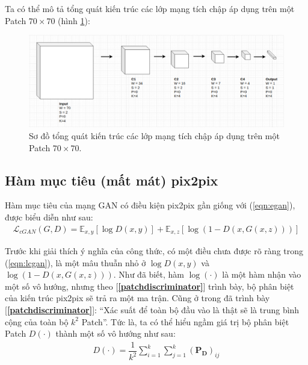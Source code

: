 \documentclass[a4paper, 12pt]{report}
\begin{document}
Ta có thể mô tả tổng quát kiến trúc các lớp mạng tích chập áp dụng trên một Patch $70 \times 70$ (hình \ref{fig:dis70pix2pix}):

\begin{figure}[!h]
\captionsetup{width=0.8\textwidth}
\centering
\includegraphics[width=16cm]{images/dis70pix2pix.png}
\caption{Sơ đồ tổng quát kiến trúc các lớp mạng tích chập áp dụng trên một Patch $70 \times 70$.}
\label{fig:dis70pix2pix}
\end{figure}

\subsection{Hàm mục tiêu (mất mát) pix2pix}\label{objofpix2pix}

Hàm mục tiêu của mạng GAN có điều kiện pix2pix gần giống với (\ref{eqn:egan}), được biểu diễn như sau:
\begin{align}
    \mathcal{L}_{cGAN}\left(G, D\right) = \mathbb{E}_{x, y}\left[\log D\left(x, y\right)\right] + \mathbb{E}_{x, z}\left[\log\left(1-D\left(x, G\left(x, z\right)\right)\right)\right]\label{eqn:lcgan}
\end{align}

Trước khi giải thích ý nghĩa của công thức, có một điều chưa được rõ ràng trong (\ref{eqn:lcgan}), là một mâu thuẫn nhỏ ở $\log D\left(x, y\right)$ và $\log\left(1-D\left(x, G\left(x, z\right)\right)\right)$.
Như đã biết, hàm $\log\left(\cdot\right)$ là một hàm nhận vào một số vô hướng, nhưng theo [\textbf{\ref{patchdiscriminator}}] trình bày, bộ phân biệt của kiến trúc pix2pix sẽ trả ra một ma trận.
Cũng ở trong đã trình bày [\textbf{\ref{patchdiscriminator}}]: ``Xác suất để toàn bộ đầu vào là thật sẽ là trung bình cộng của toàn bộ $k^2$ Patch''.
Tức là, ta có thể hiểu ngầm giá trị bộ phân biệt Patch $D\left(\cdot\right)$ thành một số vô hướng như sau:
\begin{align}
    D\left(\cdot\right) = \dfrac{1}{k^2}\sum_{i=1}^{k}\sum_{j=1}^{k}\left(\mathbf{P_D}\right)_{ij} \label{eqn:aliaslogD}
\end{align}
\end{document}

